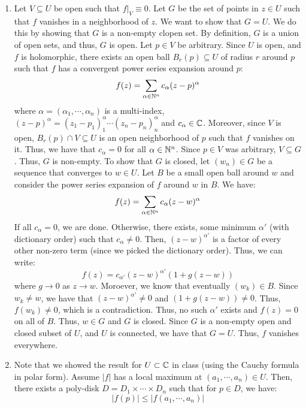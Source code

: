 \documentclass[12pt]{article}
\begin{document}
\begin{solu}
    \bbni
    \begin{enumerate}
        \item Let $V \subseteq U$ be open such that $f|_V \equiv 0$. Let $G$ be the set of points in $z \in U$ such that $f$ vanishes in a neighborhood of $z$. We want to show that $G = U$. We do this by showing that $G$ is a non-empty clopen set. \bbni        
        By definition, $G$ is a union of open sets, and thus, $G$ is open. \bbni
        Let $p \in V$ be arbitrary. Since $U$ is open, and $f$ is holomorphic, there exists an open ball $B_r(p) \subseteq U$ of radius $r$ around $p$ such that $f$ has a convergent power series expansion around $p$:
        \[ f(z) = \sum_{\alpha \in \mathbb N^n} c_\alpha (z-p)^\alpha \]
        where $\alpha = (\alpha_1, \cdots, \alpha_n)$ is a multi-index, $(z-p)^\alpha = (z_1-p_1)^\alpha_1 \cdots (z_n-p_n)^\alpha_n$ and $c_\alpha \in \mathbb C$. Moreover, since $V$ is open, $B_r(p) \cap V \subseteq U$ is an open neighborhood of $p$ such that $f$ vanishes on it. Thus, we have that $c_\alpha = 0$ for all $\alpha \in \mathbb N^n$. Since $p\in V$ was arbitrary, $V \subseteq G$. Thus, $G$ is non-empty.  \bbni
        To show that $G$ is closed, let $(w_n) \in G$ be a sequence that converges to $w \in U$. Let $B$ be a small open ball around $w$ and consider the power series expansion of $f$ around $w$ in $B$. We have: 
        \[f(z) = \sum_{\alpha \in \mathbb N^n} c_\alpha(z-w)^\alpha\]
        If all $c_\alpha = 0$, we are done. Otherwise, there exists, some minimum $\alpha'$ (with dictionary order) such that $c_\alpha \neq 0$. Then, $(z-w)^{\alpha'}$ is a factor of every other non-zero term (since we picked the dictionary order).
        Thus, we can write: 
        \[f(z) = c_{\alpha'}(z-w)^{\alpha'}(1+g(z-w)) \]
        where $g \to 0$ as $z \to w$. Moroever, we know that eventually $(w_k) \in B$. Since $w_k \neq w$, we have that $(z-w)^{\alpha'} \neq 0$ and $(1+g(z-w)) \neq 0$. Thus, $f(w_k) \neq 0$, which is a contradiction. Thus, no such $\alpha'$ exists and $f(z) = 0$ on all of $B$. Thus, $w \in G$ and $G$ is closed. \bbni
        Since $G$ is a non-empty open and closed subset of $U$, and $U$ is connected, we have that $G = U$. Thus, $f$ vanishes everywhere.
        \item Note that we showed the result for $U \subset \mathbb C$ in class (using the Cauchy formula in polar form). Assume $|f|$ has a local maximum at $(a_1, \cdots, a_n) \in U$. Then, there exists a poly-disk $D = D_1 \times \cdots \times D_n$ such that for $p \in D$, we have: 
        \[|f(p)| \leq |f(a_1, \cdots, a_n)|\]

\end{enumerate}
\end{solu}
\end{document}
